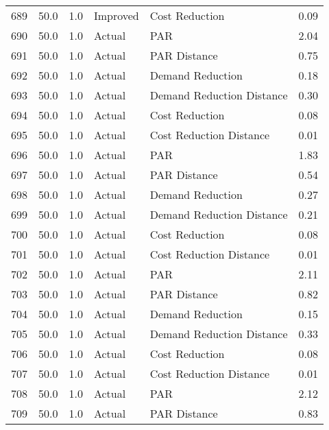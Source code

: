 \begin{longtable}{lrrllr}
689  &         50.0 &     1.0 &       Improved &             Cost Reduction &   0.09 \\
690  &         50.0 &     1.0 &         Actual &                        PAR &   2.04 \\
691  &         50.0 &     1.0 &         Actual &               PAR Distance &   0.75 \\
692  &         50.0 &     1.0 &         Actual &           Demand Reduction &   0.18 \\
693  &         50.0 &     1.0 &         Actual &  Demand Reduction Distance &   0.30 \\
694  &         50.0 &     1.0 &         Actual &             Cost Reduction &   0.08 \\
695  &         50.0 &     1.0 &         Actual &    Cost Reduction Distance &   0.01 \\
696  &         50.0 &     1.0 &         Actual &                        PAR &   1.83 \\
697  &         50.0 &     1.0 &         Actual &               PAR Distance &   0.54 \\
698  &         50.0 &     1.0 &         Actual &           Demand Reduction &   0.27 \\
699  &         50.0 &     1.0 &         Actual &  Demand Reduction Distance &   0.21 \\
700  &         50.0 &     1.0 &         Actual &             Cost Reduction &   0.08 \\
701  &         50.0 &     1.0 &         Actual &    Cost Reduction Distance &   0.01 \\
702  &         50.0 &     1.0 &         Actual &                        PAR &   2.11 \\
703  &         50.0 &     1.0 &         Actual &               PAR Distance &   0.82 \\
704  &         50.0 &     1.0 &         Actual &           Demand Reduction &   0.15 \\
705  &         50.0 &     1.0 &         Actual &  Demand Reduction Distance &   0.33 \\
706  &         50.0 &     1.0 &         Actual &             Cost Reduction &   0.08 \\
707  &         50.0 &     1.0 &         Actual &    Cost Reduction Distance &   0.01 \\
708  &         50.0 &     1.0 &         Actual &                        PAR &   2.12 \\
709  &         50.0 &     1.0 &         Actual &               PAR Distance &   0.83 \\

\end{longtable}
